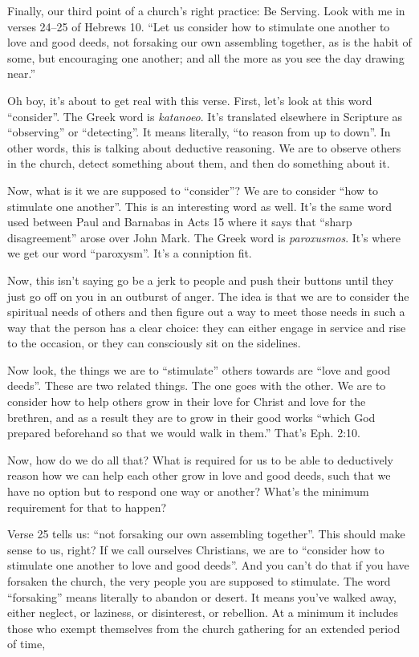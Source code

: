 \documentclass[letterpaper, 12pt]{article}
\begin{document}
    Finally, our third point of a church's right practice: Be Serving.
    Look with me in verses 24--25 of Hebrews 10. ``Let us consider how
    to stimulate one another to love and good deeds, not forsaking our
    own assembling together, as is the habit of some, but encouraging
    one another; and all the more as you see the day drawing near.''

    Oh boy, it's about to get real with this verse. First, let's look at
    this word ``consider''. The Greek word is \emph{katanoeo}. It's
    translated elsewhere in Scripture as ``observing'' or ``detecting''.
    It means literally, ``to reason from up to down''. In other words,
    this is talking about deductive reasoning. We are to observe others
    in the church, detect something about them, and then do something
    about it.

    Now, what is it we are supposed to ``consider''? We are to consider
    ``how to stimulate one another''. This is an interesting word as
    well. It's the same word used between Paul and Barnabas in Acts 15
    where it says that ``sharp disagreement'' arose over John Mark. The
    Greek word is \emph{paroxusmos}. It's where we get our word
    ``paroxysm''. It's a conniption fit.

    Now, this isn't saying go be a jerk to people and push their buttons
    until they just go off on you in an outburst of anger. The idea is
    that we are to consider the spiritual needs of others and then
    figure out a way to meet those needs in such a way that the person
    has a clear choice: they can either engage in service and rise to
    the occasion, or they can consciously sit on the sidelines.

    Now look, the things we are to ``stimulate'' others towards are
    ``love and good deeds''. These are two related things. The one goes
    with the other. We are to consider how to help others grow in their
    love for Christ and love for the brethren, and as a result they are
    to grow in their good works ``which God prepared beforehand so that
    we would walk in them.'' That's Eph. 2:10.

    Now, how do we do all that? What is required for us to be able to
    deductively reason how we can help each other grow in love and good
    deeds, such that we have no option but to respond one way or
    another? What's the minimum requirement for that to happen?

    Verse 25 tells us: ``not forsaking our own assembling together''.
    This should make sense to us, right? If we call ourselves
    Christians, we are to ``consider how to stimulate one another to
    love and good deeds''. And you can't do that if you have forsaken
    the church, the very people you are supposed to stimulate. The word
    ``forsaking'' means literally to abandon or desert. It means you've
    walked away, either neglect, or laziness, or disinterest, or
    rebellion. At a minimum it includes those who exempt themselves from
    the church gathering for an extended period of time,
\end{document}
